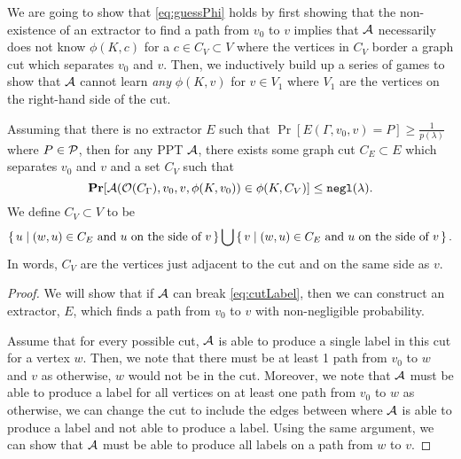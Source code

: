 We are going to show that \cref{eq:guessPhi} holds by first showing that
the non-existence of an extractor to find a path from $v_0$ to $v$ implies that $\mathcal{A}$
necessarily does not know $\phi(K, c)$ for a $c \in C_V \subset V$ where the vertices in $C_V$ border 
a graph cut which separates $v_0$ and $v$. Then, we inductively build up a series of games to show that
$\mathcal{A}$ cannot learn \emph{any} $\phi(K, v)$ for $v \in V_1$ where $V_1$ are the vertices on the right-hand side of the cut.

\begin{lemma}
	\label{lemma:cutBaseCase}
	Assuming that there is no extractor $E$ such that $\Pr[E(\Gamma, v_0, v) = P] \geq \frac{1}{p(\lambda)}$
	where $P \in \mathcal{P}$, then for any PPT $\mathcal{A}$, there exists some graph cut 
	$C_E \subset E$ which separates $v_0$ and $v$ and a set $C_V$ such that
	\begin{equation}
		\label{eq:cutLabel}
		\operatorname*{\mathbf{Pr}}[\mathcal{A}(\mathcal{O}(C_\Gamma), v_0, v, \phi(K, v_0)) \in \phi(K, C_V)] \leq \texttt{negl}(\lambda).
	\end{equation}
		We define $C_V \subset V$ to be
	\begin{equation*}
		\set{ u \mid (w, u) \in C_E \text{ and } u \text { on the side of } v} \bigcup \set{ v \mid (w, u) \in C_E \text{ and } u \text { on the side of } v}.
	\end{equation*}
	In words, $C_V$ are the vertices just adjacent to the cut and on the same side as $v$.
	\begin{proof}
		We will show that if $\mathcal{A}$ can break \cref{eq:cutLabel}, then we can construct an extractor,
		$E$, which finds a path from $v_0$ to $v$ with non-negligible probability.

		Assume that for every possible cut, $\mathcal{A}$ is able to produce a single label in this cut for a vertex $w$.
		Then, we note that there must be at least 1 path from $v_0$ to $w$ and $v$ as otherwise, $w$ would not be in the cut.
		Moreover, we note that $\mathcal{A}$ must be able to produce a label for all vertices on at least one path
		from $v_0$ to $w$ as otherwise, we can change the cut to include the edges between where
		$\mathcal{A}$ is able to produce a label and not able to produce a label. Using the same argument,
		we can show that $\mathcal{A}$ must be able to produce all labels on a path from $w$ to $v$.


\end{proof}
\end{lemma}
